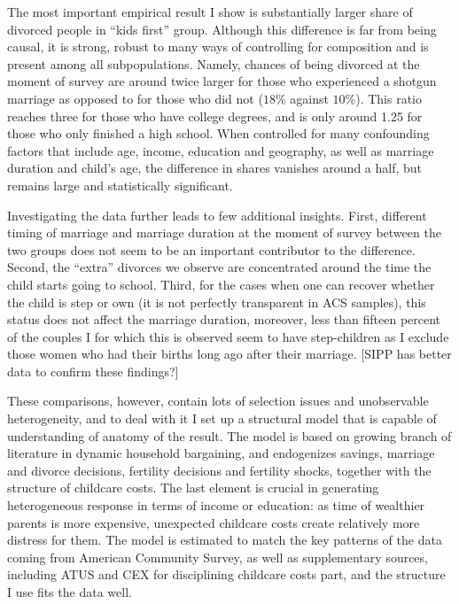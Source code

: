 \documentclass[12pt,letter]{article}
\begin{document}
The most important empirical result I show is substantially larger share of divorced people in ``kids first'' group. Although this difference is far from being causal, it is strong, robust to many ways of controlling for composition and is present among all subpopulations. Namely, chances of being divorced at the moment of survey are around twice larger for those who experienced a shotgun marriage as opposed to for those who did not ($18\%$ against $10\%$). This ratio reaches three for those who have college degrees, and is only around 1.25 for those who only finished a high school. When controlled for many confounding factors that include age, income, education and geography, as well as marriage duration and child's age, the difference in shares vanishes around a half, but remains large and statistically significant.  %

Investigating the data further leads to few additional insights. First, different timing of marriage and marriage duration at the moment of survey between the two groups does not seem to be an important contributor to the difference. Second, the ``extra'' divorces we observe are concentrated around the time the child starts going to school. Third, for the cases when one can recover whether the child is step or own (it is not perfectly transparent in ACS samples), this status does not affect the marriage duration, moreover, less than fifteen percent of the couples I for which this is observed seem to have step-children as I exclude those women who had their births long ago after their marriage. [SIPP has better data to confirm these findings?]

These comparisons, however, contain lots of selection issues and unobservable heterogeneity, and to deal with it I set up a structural model that is capable of understanding of anatomy of the result. The model is based on growing branch of literature in dynamic household bargaining, and endogenizes savings, marriage and divorce decisions, fertility decisions and fertility shocks, together with the structure of childcare costs. The last element is crucial in generating heterogeneous response in terms of income or education: as time of wealthier parents is more expensive, unexpected childcare costs create relatively more distress for them. The model is estimated to match the key patterns of the data coming from American Community Survey, as well as supplementary sources, including ATUS and CEX for disciplining childcare costs part, and the structure I use fits the data well.
\end{document}
